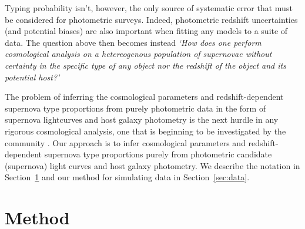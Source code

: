 \documentclass[12pt, twocolumn]{emulateapj}
\newcommand{\textul}{\underline}
\newcommand{\tkRH}[1]{\textcolor{blue}{#1}}  %
\newcommand{\tkAM}[1]{\textcolor{green}{#1}}  %
\begin{document}
Typing probability isn't, however, the only source of systematic error that must be considered for photometric surveys.
Indeed, photometric redshift uncertainties (and potential biases) are also important when fitting any models to a suite of data. 
The question above then becomes instead \textit{`How does one perform cosmological analysis on a hetereogenous population of supernovae without certainty in the specific type of any object nor the redshift of the object and its potential host?'}

The problem of inferring the cosmological parameters and redshift-dependent supernova type proportions from purely photometric data in the form of supernova lightcurves and host galaxy photometry is the next hurdle in any rigorous cosmological analysis, one that is beginning to be investigated by the community \citep{Roberts_2017}.
Our approach is to infer cosmological parameters and redshift-dependent supernova type proportions purely from photometric candidate (supernova) light curves and host galaxy photometry.
We describe the notation in Section~\ref{sec:method} and our method for simulating data in Section~\ref{sec:data}.


\section{Method}
\label{sec:method}

\end{document}
